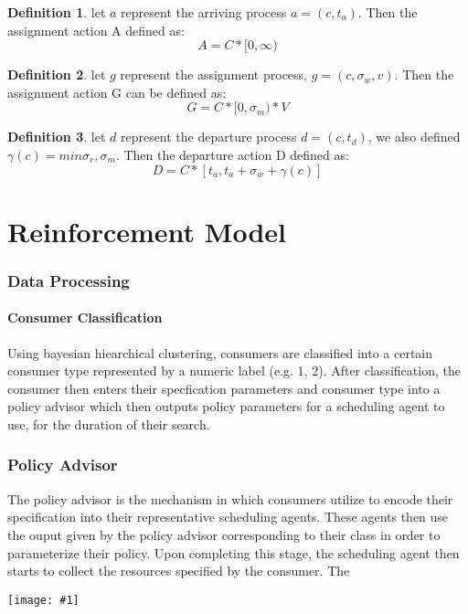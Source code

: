\documentclass{article}
\theoremstyle{definition}
\newtheorem{definition}{Definition}[section]
\theoremstyle{remark}
\newcommand{\addpic}[1]{\texttt{[image: \#1]}}
\begin{document}
		\begin{definition}
			let $a$ represent the arriving process $a = (c, t_a)$. Then the assignment action A defined as:
			\[
			A = C * [0, \infty)
			\]
		\end{definition}
		
		\begin{definition}
			let $g$ represent the assignment process, $g = (c,\sigma_w, v)$. Then the assignment action G can be defined as:
			\[
			G = C*[0,\sigma_m)*V
			\]
		\end{definition}
		
		\begin{definition}
			let $d$ represent the departure process $d = (c, t_d)$, we also defined $\gamma(c) = min{\sigma_r,\sigma_m}.$ Then the departure action D defined as:
			\[
			D = C * [t_a, t_a + \sigma_w + \gamma(c)]
			\]
		\end{definition}
	
	\newpage
	
	\part{Reinforcement Model}
	
	\section{Data Processing}
	
	\subsection{Consumer Classification}
	Using bayesian hiearchical clustering, consumers are classified into a certain consumer type represented by a numeric label (e.g. 1, 2). After classification, the consumer then enters their specfication parameters and consumer type into a policy advisor which then outputs policy parameters for a scheduling agent to use, for the duration of their search.
	
	\section{Policy Advisor}
	The policy advisor is the mechanism in which consumers utilize to encode their specification into their representative scheduling 	  agents. These agents then use the ouput given by the policy advisor corresponding to their class in order to parameterize their           policy. Upon completing this stage, the scheduling agent then starts to collect the resources specified by the consumer. The 
	
	\addpic{Policy.png}
	\newpage    
	
\end{document}
